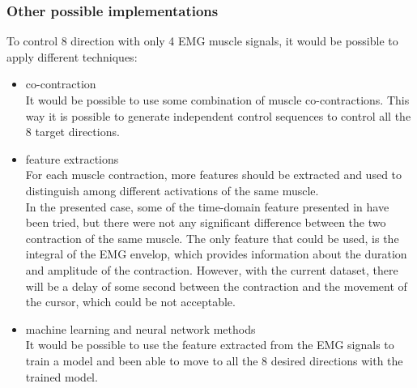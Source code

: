 \documentclass{article}
\begin{document}
	\subsubsection*{Other possible implementations}
	To control 8 direction with only 4 EMG muscle signals, it would be possible to apply different techniques:
	\begin{itemize}
		\item co-contraction\\
			It would be possible to use some combination of muscle co-contractions. This way it is possible to generate independent control sequences to control all the 8 target directions.
		\item feature extractions\\
			For each muscle contraction, more features should be extracted and used to distinguish among different activations of the same muscle.\\
			In the presented case, some of the time-domain feature presented in \cite{emgFeatures} have been tried, but there were not any significant difference between the two contraction of the same muscle. The only feature that could be used, is the integral of the EMG envelop, which provides information about the duration and amplitude of the contraction. However, with the current dataset, there will be a delay of some second between the contraction and the movement of the cursor, which could be not acceptable.
		\item machine learning and neural network methods\\
			It would be possible to use the feature extracted from the EMG signals to train a model and been able to move to all the 8 desired directions with the trained model.
	\end{itemize}

\printbibliography
\end{document}
